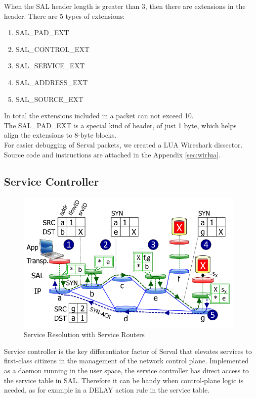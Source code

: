 \newpage
When the SAL header length is greater than 3, then there are extensions in the header.
There are 5 types of extensions:
\begin{enumerate} \itemsep1pt \parskip0pt 
  \item SAL\_PAD\_EXT
  \item SAL\_CONTROL\_EXT
  \item SAL\_SERVICE\_EXT
  \item SAL\_ADDRESS\_EXT
  \item SAL\_SOURCE\_EXT
\end{enumerate}
In total the extensions included in a packet can not exceed 10.
\\ The SAL\_PAD\_EXT is a special kind of header, of just 1 byte, which helps align the extensions to 8-byte blocks.
\\[0.2cm]
\noindent For easier debugging of Serval packets, we created a LUA Wireshark dissector.
Source code and instructions are attached in the Appendix \ref{sec:wirlua}.



\newpage
\subsection{Service Controller}

\begin{figure}
\centering
{}
\includegraphics[scale=0.4]{figures/establishing_connection}
\caption[Service Resolution with Service Routers]{Service Resolution with Service Routers}
\label{fig:sal_position}
\end{figure}

Service controller is the key differentiator factor of Serval that elevates services to first-class citizens in the management of the network control plane.
Implemented as a daemon running in the user space, the service controller has direct access to the service table in SAL.
Therefore it can be handy when control-plane logic is needed, as for example in a DELAY action rule in the service table.

